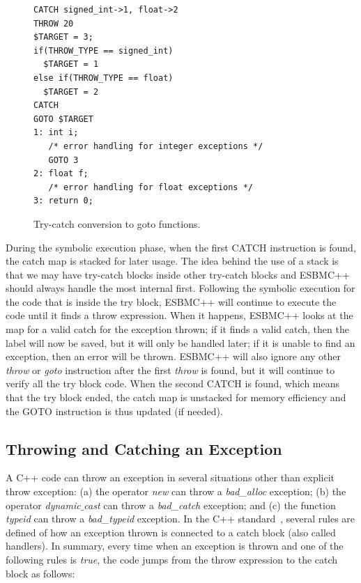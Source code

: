 \documentclass[a4paper]{llncs}
\begin{document}
\begin{figure}[ht]
\centering
\begin{minipage}{1.0\textwidth}
\begin{lstlisting}
CATCH signed_int->1, float->2
THROW 20
$TARGET = 3;
if(THROW_TYPE == signed_int)
  $TARGET = 1
else if(THROW_TYPE == float)
  $TARGET = 2
CATCH
GOTO $TARGET
1: int i; 
   /* error handling for integer exceptions */
   GOTO 3
2: float f;
   /* error handling for float exceptions */
3: return 0;
\end{lstlisting}
\end{minipage}
\caption{Try-catch conversion to goto functions.}
\label{figure:try-catch-goto} \vspace*{-4ex}
\end{figure}

During the symbolic execution phase, when the first
CATCH instruction is found, the catch map is stacked
for later usage. The idea behind the use of a stack is
that we may have try-catch blocks inside other
try-catch blocks and ESBMC++ should always handle
the most internal first. Following the symbolic execution
for the code that is inside the try block, ESBMC++ will continue 
to execute the code until it finds a throw expression. 
When it happens, ESBMC++ looks at the map for a valid catch 
for the exception thrown; if it finds a valid catch, then the label 
will now be saved, but it will only be handled later;
if it is unable to find an exception, then an error will be thrown.
ESBMC++ will also ignore any other \textit{throw} or \textit{goto} 
instruction after the first \textit{throw} is found, but it will continue 
to verify all the try block code. When the second CATCH is found, 
which means that the try block ended, the catch map is unstacked for
 memory efficiency and the GOTO instruction is thus updated (if needed).

\subsection{Throwing and Catching an Exception}

A C++ code can throw an exception in several situations other
than explicit throw exception: (a) the operator \textit{new} can throw 
a \textit{bad\_alloc} exception; (b) the operator 
\textit{dynamic$\_$cast} can throw a \textit{bad\_catch}
exception; and (c) the function \textit{typeid} can throw a 
\textit{bad\_typeid} exception.
In the C++ standard~\cite{CppDraft}, 
several rules are defined of how an exception
thrown is connected to a catch block (also called handlers). 
In summary, every time when an exception is thrown and
one of the following rules is \textit{true}, the code jumps 
from the throw expression to the catch block as follows:
\end{document}
